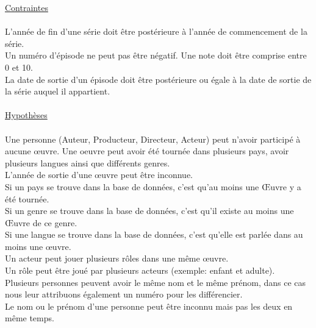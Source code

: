 \documentclass[10pt,a4paper]{article}
\begin{document}
\noindent\underline{Contraintes}
\\ \\ L'année de fin d'une série doit être postérieure à l'année de commencement de la série. \\ Un numéro d’épisode ne peut pas être négatif. Une note doit être comprise entre 0 et 10. \\
La date de sortie d’un épisode doit être postérieure ou égale à la date de sortie de la série auquel il appartient.
\\
\\
\noindent\underline{Hypothèses}
\\ \\ Une personne (Auteur, Producteur, Directeur, Acteur) peut n’avoir participé à aucune œuvre.
Une oeuvre peut avoir été tournée dans plusieurs pays, avoir plusieurs langues ainsi que différents genres.\\
L’année de sortie d’une œuvre peut être inconnue. \\
Si un pays se trouve dans la base de données, c’est qu’au moins une Œuvre y a été tournée. \\
Si un genre se trouve dans la base de données, c’est qu’il existe au moins une Œuvre de ce genre. \\
Si une langue se trouve dans la base de données, c’est qu’elle est parlée dans au moins une œuvre. \\
Un acteur peut jouer plusieurs rôles dans une même œuvre. \\
Un rôle peut être joué par plusieurs acteurs (exemple: enfant et adulte). \\
Plusieurs personnes peuvent avoir le même nom et le même prénom, dans ce cas nous leur attribuons également un numéro pour les différencier.\\
Le nom ou le prénom d’une personne peut être inconnu mais pas les deux en même temps.
\end{document}
